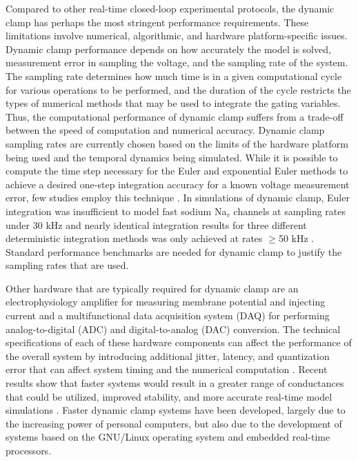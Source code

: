 Compared to other real-time closed-loop experimental protocols, the dynamic clamp has perhaps the most stringent performance requirements. These limitations involve numerical, algorithmic, and hardware platform-specific issues. Dynamic clamp performance depends on how accurately the model is solved, measurement error in sampling the voltage, and the sampling rate of the system. The sampling rate determines how much time is in a given computational cycle for various operations to be performed, and the duration of the cycle restricts the types of numerical methods that may be used to integrate the gating variables. Thus, the computational performance of dynamic clamp suffers from a trade-off between the speed of computation and numerical accuracy. Dynamic clamp sampling rates are currently chosen based on the limits of the hardware platform being used and the temporal dynamics being simulated. While it is possible to compute the time step necessary for the Euler and exponential Euler methods to achieve a desired one-step integration accuracy for a known voltage measurement error, few studies employ this technique \cite{Butera:2004p1073}. In simulations of dynamic clamp, Euler integration was insufficient to model fast sodium Na$_{v}$ channels at sampling rates under 30 kHz and nearly identical integration results for three different deterministic integration methods was only achieved at rates $\geq$50 kHz \cite{Milescu:2008p1216}. Standard performance benchmarks are needed for dynamic clamp to justify the sampling rates that are used.

Other hardware that are typically required for dynamic clamp are an electrophysiology amplifier for measuring membrane potential and injecting current and a multifunctional data acquisition system (DAQ) for performing analog-to-digital (ADC) and digital-to-analog (DAC) conversion. The technical specifications of each of these hardware components can affect the performance of the overall system by introducing additional jitter, latency, and quantization error that can affect system timing and the numerical computation \cite{Bettencourt:2008p1114, Butera:2001p910}. Recent results show that faster systems would result in a greater range of conductances that could be utilized, improved stability, and more accurate real-time model simulations \cite{Preyer:2007p359,Preyer:2009p1228}. Faster dynamic clamp systems have been developed, largely due to the increasing power of personal computers, but also due to the development of systems based on the GNU/Linux operating system and embedded real-time processors. 